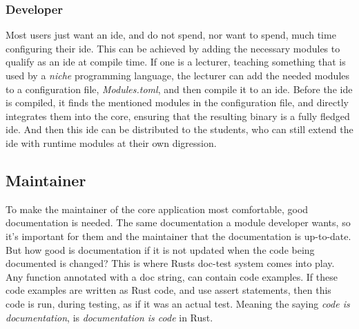 \subsubsection{Developer}

Most users just want an \gls{ide}, and do not spend, nor want to spend, much
time configuring their \gls{ide}. This can be achieved by adding the necessary
modules to qualify as an \gls{ide} at compile time. If one is a lecturer,
teaching something that is used by a \textit{niche} programming language, the
lecturer can add the needed modules to a configuration file,
\textit{Modules.toml}, and then compile it to an \gls{ide}. Before the \gls{ide}
is compiled, it finds the mentioned modules in the configuration file, and
directly integrates them into the core, ensuring that the resulting binary is a
fully fledged \gls{ide}. And then this \gls{ide} can be distributed to the
students, who can still extend the \gls{ide} with runtime modules at their own
digression.

\subsection{Maintainer}

To make the maintainer of the core application most comfortable, good
documentation is needed. The same documentation a module developer wants, so
it's important for them and the maintainer that the documentation is up-to-date.
But how good is documentation if it is not updated when the code being
documented is changed? This is where Rusts doc-test system comes into play. Any
function annotated with a doc string, can contain code examples. If these code
examples are written as Rust code, and use assert statements, then this code is
run, during testing, as if it was an actual test. Meaning the saying
\textit{code is documentation}, is \textit{documentation is code} in Rust.

